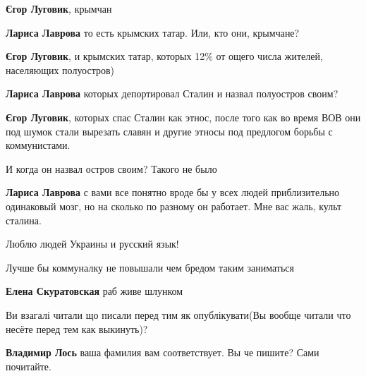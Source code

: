 \begin{itemize}
\begin{itemize}
\textbf{Єгор Луговик}, крымчан

\textbf{Лариса Лаврова} то есть крымских татар. Или, кто они, крымчане?

\textbf{Єгор Луговик}, и крымских татар, которых 12\% от ощего числа жителей, населяющих полуостров)

\textbf{Лариса Лаврова} которых депортировал Сталин и назвал полуостров своим?

\textbf{Єгор Луговик}, которых спас Сталин как этнос, после того как во время ВОВ они под шумок стали вырезать славян и другие этносы под предлогом борьбы с коммунистами.

И когда он назвал остров своим? Такого не было

\textbf{Лариса Лаврова} с вами все понятно \Laughey[1.0][white]\Laughey[1.0][white]\Laughey[1.0][white]\Laughey[1.0][white]\Laughey[1.0][white] вроде бы у всех людей приблизительно одинаковый мозг, но на сколько по разному он работает. Мне вас жаль, культ сталина.

\end{itemize}

Люблю людей Украины и русский язык!

Лучше бы коммуналку не повышали чем бредом таким заниматься

\textbf{Елена Скуратовская} раб живе шлунком


Ви взагалі читали що писали перед тим як опублікувати(Вы вообще читали что
несёте перед тем как выкинуть)?

\begin{itemize}
\textbf{Владимир Лось} ваша фамилия вам соответствует. Вы че пишите? Сами почитайте.


\end{itemize}
\end{itemize}
